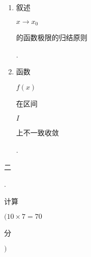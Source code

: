 \documentclass[10pt]{article}
\begin{document}
\begin{enumerate}
  \item \begin{CJK}{UTF8}{mj}叙述\end{CJK} $x \rightarrow x_{0}$ \begin{CJK}{UTF8}{mj}的函数极限的归结原则\end{CJK}.

  \item \begin{CJK}{UTF8}{mj}函数\end{CJK} $f(x)$ \begin{CJK}{UTF8}{mj}在区间\end{CJK} $I$ \begin{CJK}{UTF8}{mj}上不一致收敛\end{CJK}.

\end{enumerate}
\begin{CJK}{UTF8}{mj}二\end{CJK}. \begin{CJK}{UTF8}{mj}计算\end{CJK} $(10 \times 7=70$ \begin{CJK}{UTF8}{mj}分\end{CJK} $)$
\end{document}
